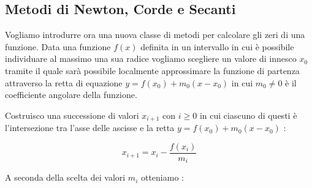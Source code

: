 \documentclass[12pt, a4paper]{book}
\theoremstyle{definition}
\begin{document}
\subsection{Metodi di Newton, Corde e Secanti}
\begin{flushleft}

Vogliamo introdurre ora una nuova classe di metodi per calcolare gli zeri di una funzione. 
Data una funzione $f(x)$ definita in un intervallo in cui è possibile individuare al massimo una sua radice vogliamo scegliere un valore di innesco $x_{0}$ tramite il quale sarà possibile localmente approssimare la funzione di partenza attraverso la retta di equazione $y = f(x_{0}) + m_{0}(x-x_{0})$ in cui $m_{0} \neq 0$ è il coefficiente angolare della funzione.

\begin{figure}[h!]
\centering
{}
\end{figure}

Costruisco una successione di valori $x_{i+1}$ con $i \geq 0$ in cui ciascuno di questi è l'intersezione tra l'asse delle ascisse e 
la retta $y = f(x_{0}) + m_{0}(x-x_{0})$ :

\[ 	
	x_{i+1}  = x_{i} - \frac{f(x_{i})}{m_{i}}
\]

A seconda della scelta dei valori $m_{i}$ otteniamo : 


\end{flushleft}
\end{document}
